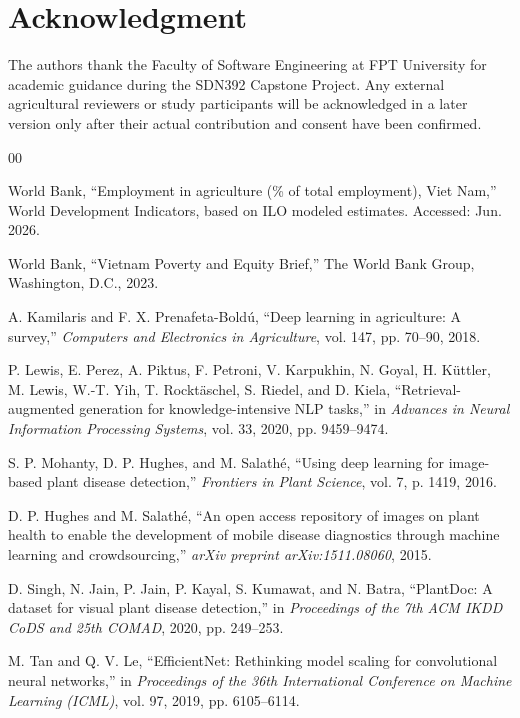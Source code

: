 \documentclass[conference]{IEEEtran}
\begin{document}
\section*{Acknowledgment}

The authors thank the Faculty of Software Engineering at FPT University for academic guidance during the SDN392 Capstone Project. Any external agricultural reviewers or study participants will be acknowledged in a later version only after their actual contribution and consent have been confirmed.

\begin{thebibliography}{00}

World Bank, ``Employment in agriculture (\% of total employment), Viet Nam,'' World Development Indicators, based on ILO modeled estimates. Accessed: Jun. 2026.

World Bank, ``Vietnam Poverty and Equity Brief,'' The World Bank Group, Washington, D.C., 2023.

A. Kamilaris and F. X. Prenafeta-Bold\'{u}, ``Deep learning in agriculture: A survey,'' \textit{Computers and Electronics in Agriculture}, vol. 147, pp. 70--90, 2018.

P. Lewis, E. Perez, A. Piktus, F. Petroni, V. Karpukhin, N. Goyal, H. K\"{u}ttler, M. Lewis, W.-T. Yih, T. Rockt\"{a}schel, S. Riedel, and D. Kiela, ``Retrieval-augmented generation for knowledge-intensive NLP tasks,'' in \textit{Advances in Neural Information Processing Systems}, vol. 33, 2020, pp. 9459--9474.

S. P. Mohanty, D. P. Hughes, and M. Salath\'{e}, ``Using deep learning for image-based plant disease detection,'' \textit{Frontiers in Plant Science}, vol. 7, p. 1419, 2016.

D. P. Hughes and M. Salath\'{e}, ``An open access repository of images on plant health to enable the development of mobile disease diagnostics through machine learning and crowdsourcing,'' \textit{arXiv preprint arXiv:1511.08060}, 2015.

D. Singh, N. Jain, P. Jain, P. Kayal, S. Kumawat, and N. Batra, ``PlantDoc: A dataset for visual plant disease detection,'' in \textit{Proceedings of the 7th ACM IKDD CoDS and 25th COMAD}, 2020, pp. 249--253.

M. Tan and Q. V. Le, ``EfficientNet: Rethinking model scaling for convolutional neural networks,'' in \textit{Proceedings of the 36th International Conference on Machine Learning (ICML)}, vol. 97, 2019, pp. 6105--6114.


\end{thebibliography}
\end{document}
